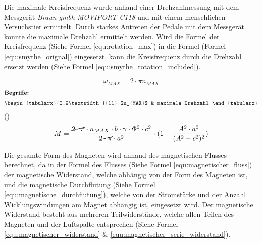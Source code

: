 Die maximale Kreisfrequenz wurde anhand einer Drehzahlmessung mit dem Messgerät \textit{Braun gmbh MOVIPORT C118} und mit einem menschlichen Versuchstier ermittelt. Durch starkes Antreten der Pedale mit dem Messgerät konnte die maximale Drehzahl ermittelt werden. Wird die Formel der Kreisfrequenz (Siehe Formel \ref{equ:rotation_max}) in die Formel (Formel \ref{equ:smythe_orignal}) eingesetzt, kann die Kreisfrequenz durch die Drehzahl ersetzt werden (Siehe Formel \ref{equ:smythe_rotation_included}).

\begin{equation}
  \label{equ:rotation_max}
  \omega_{MAX}=2\cdot\pi n_{MAX}
\end{equation}
\begin{gather}
\shortintertext{\textbf{Begriffe:}}
\begin{tabularx}{0.9\textwidth}{ll}
  $n_{MAX}$	& maximale Drehzahl
\end{tabularx}\nonumber
\end{gather}
(\cite[S.193]{kuchling2014taschenbuch})
\newpara
\begin{equation}
  \label{equ:smythe_rotation_included}
  M = \frac{\cancel{2\cdot\pi}\cdot n_{MAX}\cdot b \cdot \gamma \cdot \Phi^{2}\cdot c^{2}}{\cancel{2\cdot\pi}\cdot a^{2}}\cdot(1-\frac{A^{2}\cdot a^{2}}{(A^{2}-c^{2})^{2}})
\end{equation}


Die gesamte Form des Magneten wird anhand des magnetischen Flusses berechnet, da in der Formel des Flusses (Siehe Formel \ref{equ:magnetischer_fluss}) der magnetische Widerstand, welche abhängig von der Form des Magneten ist, und die magnetische Durchflutung (Siehe Formel \ref{equ:magnetische_durchflutung}), welche von der Stromstärke und der Anzahl Wicklungswindungen am Magnet abhängig ist, eingesetzt wird. Der magnetische Widerstand besteht aus mehreren Teilwiderstände, welche allen Teilen des Magneten und der Luftspalte entsprechen (Siehe Formel \ref{equ:magnetischer_widerstand} \& \ref{equ:magnetischer_serie_widerstand}).

